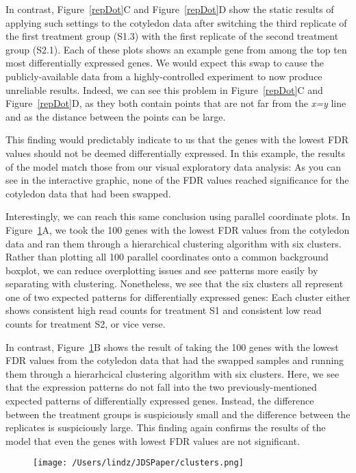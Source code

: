 \documentclass[useAMS,referee]{biom}
\begin{document}
In contrast, Figure~\ref{repDot}C and Figure~\ref{repDot}D show the static results of applying such settings to the cotyledon data after switching the third replicate of the first treatment group (S1.3) with the first replicate of the second treatment group (S2.1). Each of these plots shows an example gene from among the top ten most differentially expressed genes. We would expect this swap to cause the publicly-available data from a highly-controlled experiment to now produce unreliable results. Indeed, we can see this problem in Figure~\ref{repDot}C and Figure~\ref{repDot}D, as they both contain points that are not far from the \textit{x=y} line and as the distance between the points can be large.

This finding would predictably indicate to us that the genes with the lowest FDR values should not be deemed differentially expressed. In this example, the results of the model match those from our visual exploratory data analysis: As you can see in the interactive graphic, none of the FDR values reached significance for the cotyledon data that had been swapped.

Interestingly, we can reach this same conclusion using parallel coordinate plots. In Figure~\ref{clusters}A, we took the 100 genes with the lowest FDR values from the cotyledon data and ran them through a hierarchical clustering algorithm with six clusters. Rather than plotting all 100 parallel coordinates onto a common background boxplot, we can reduce overplotting issues and see patterns more easily by separating with clustering. Nonetheless, we see that the six clusters all represent one of two expected patterns for differentially expressed genes: Each cluster either shows consistent high read counts for treatment S1 and consistent low read counts for treatment S2, or vice verse.

In contrast, Figure~\ref{clusters}B shows the result of taking the 100 genes with the lowest FDR values from the cotyledon data that had the swapped samples and running them through a hierarhcical clustering algorithm with six clusters. Here, we see that the expression patterns do not fall into the two previously-mentioned expected patterns of differentially expressed genes. Instead, the difference between the treatment groups is suspiciously small and the difference between the replicates is suspiciously large. This finding again confirms the results of the model that even the genes with lowest FDR values are not significant.

\begin{figure}
\begin{center}
\centerline{\texttt{[image: /Users/lindz/JDSPaper/clusters.png]}}
\end{center}
\caption{
\label{clusters}}
\end{figure}
\end{document}
